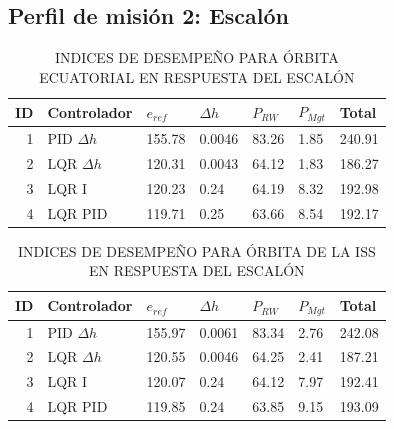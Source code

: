 \subsection{Perfil de misión 2: Escalón}

\begin{table}[!h]\label{table:step_ecuatorial}	
	\caption{\MakeUppercase{Indices de desempeño para órbita ecuatorial en respuesta del escalón}}
	\centering
	\begin{tabular}{r|lllll|l}
		\multicolumn{1}{l|}{\textbf{ID}} & \textbf{Controlador}                  & \mbox{\boldmath$e_{ref}$}   & \mbox{\boldmath$\Delta h$} & \mbox{\boldmath$P_{RW}$}   & \mbox{\boldmath$P_{Mgt}$}    & \textbf{Total}      \\ 
		\hline
		1                       & PID $\Delta h$ & 155.78 & 0.0046 &83.26 &1.85 &240.91  \\
		2                       & LQR $\Delta h$ & 120.31 & 0.0043     &64.12   &1.83    & 186.27  \\
		3                       & LQR I          & 120.23 & 0.24      &64.19   &8.32    & 192.98  \\
		4                       & LQR PID        & 119.71 & 0.25      &63.66 & 8.54 & 192.17  \\
		\hline
	\end{tabular}
\end{table}


\begin{table}[!h]\label{table:step_iss}	
	\caption{\MakeUppercase{Indices de desempeño para órbita de la ISS en respuesta del escalón }}
	\centering
	\begin{tabular}{r|lllll|l}
		\multicolumn{1}{l|}{\textbf{ID}} & \textbf{Controlador}                  & \mbox{\boldmath$e_{ref}$}   & \mbox{\boldmath$\Delta h$} & \mbox{\boldmath$P_{RW}$}   & \mbox{\boldmath$P_{Mgt}$}    & \textbf{Total}      \\ 
		\hline
		1                       & PID $\Delta h$ & 155.97 & 0.0061& 83.34 & 2.76& 242.08  \\
		2                       & LQR $\Delta h$ & 120.55 & 0.0046 &64.25 &2.41 & 187.21  \\
		3                       & LQR I          & 120.07 & 0.24       &64.12  & 7.97 &192.41  \\
		4                       & LQR PID        & 119.85 & 0.24       & 63.85 &9.15 &  193.09  \\
		\hline
	\end{tabular}
\end{table}

